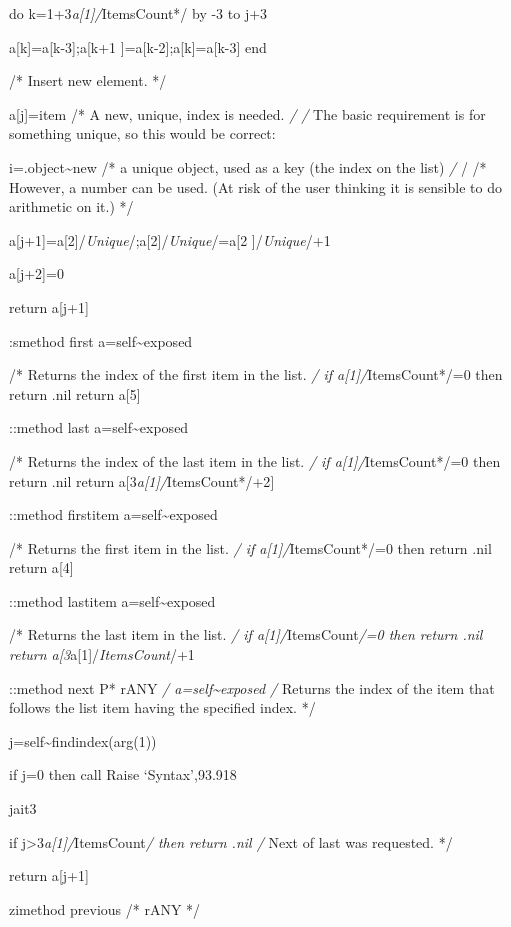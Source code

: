 do k=1+3\emph{a{[}1{]}/}ItemsCount*/ by -3 to j+3

a{[}k{]}=a{[}k-3{]};a{[}k+1 {]}=a{[}k-2{]};a{[}k{]}=a{[}k-3{]} end

/* Insert new element. */

a{[}j{]}=item /* A new, unique, index is needed. \emph{/ /} The basic
requirement is for something unique, so this would be correct:

i=.object\textasciitilde new /* a unique object, used as a key (the
index on the list) \emph{/ }/ /* However, a number can be used. (At risk
of the user thinking it is sensible to do arithmetic on it.) */

a{[}j+1{]}=a{[}2{]}/\emph{Unique}/;a{[}2{]}/\emph{Unique}/=a{[}2
{]}/\emph{Unique}/+1

a{[}j+2{]}=0

return a{[}j+1{]}

:smethod first a=self\textasciitilde exposed

/* Returns the index of the first item in the list. \emph{/ if
a{[}1{]}/}ItemsCount*/=0 then return .nil return a{[}5{]}

::method last a=self\textasciitilde exposed

/* Returns the index of the last item in the list. \emph{/ if
a{[}1{]}/}ItemsCount*/=0 then return .nil return
a{[}3\emph{a{[}1{]}/}ItemsCount*/+2{]}\textbar{}

::method firstitem a=self\textasciitilde exposed

/* Returns the first item in the list. \emph{/ if
a{[}1{]}/}ItemsCount*/=0 then return .nil return a{[}4{]}

::method lastitem a=self\textasciitilde exposed

/* Returns the last item in the list. \emph{/ if
a{[}1{]}/}ItemsCount\emph{/=0 then return .nil return
a{[}3}a{[}1{]}/\emph{ItemsCount}/+1 \textbar{}

::method next P* rANY \emph{/ a=self\textasciitilde exposed /} Returns
the index of the item that follows the list item having the specified
index. */

j=self\textasciitilde findindex(arg(1))

if j=0 then call Raise `Syntax',93.918

jait3

if j\textgreater3\emph{a{[}1{]}/}ItemsCount\emph{/ then return .nil /}
Next of last was requested. */

return a{[}j+1{]}

zimethod previous /* rANY */

